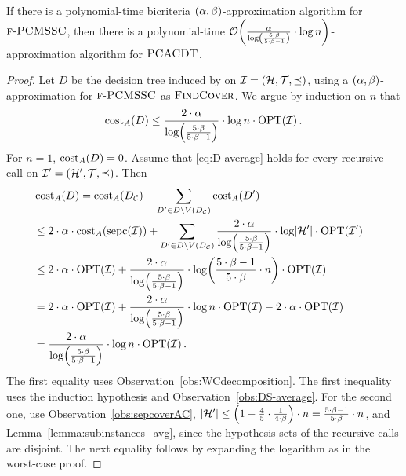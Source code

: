 \begin{theorem}\label{thm:PCMSSC-to-PCACDT}
    \setlength{\emergencystretch}{2em}
    If there is a polynomial-time bicriteria $\br{\alpha, \beta}$-approximation algorithm for $\ProblemPCMSSC$, then there is a polynomial-time $\bigo\br{\frac{\alpha}{\log\br{\frac{5\cdot\beta}{5\cdot\beta -1}}}\cdot \log n}$-approximation algorithm for $\ProblemPCACDT$.
\end{theorem}
\begin{proof}
    \setlength{\emergencystretch}{2em}
    Let $D$ be the decision tree induced by \ProcDecisionTree on $\cI=\br{\cH,\cT,\preceq}$, using a $\br{\alpha,\beta}$-approximation for $\ProblemPCMSSC$ as $\blackBox$.
    We argue by induction on $n$ that
    \begin{equation} \label{eq:D-average}
     \COSTA\br{D} \leq \frac{2\cdot\alpha}{\log\br{\frac{5\cdot\beta}{5\cdot\beta -1}}}\cdot \log n \cdot \OPT\br{\cI}.
    \end{equation}
    For $n=1$, $\COSTA\br{D}=0$. Assume that \eqref{eq:D-average} holds for every recursive call on $\cI'=\br{\cH',\cT,\preceq}$. Then
\begin{align*}
    &\COSTA\br{D}=\COSTA\br{D_{\cC}}+\sum_{D'\in D\setminus V\br{D_{\cC}}}\COSTA\br{D'} &&\\
    &\leq 2\cdot\alpha\cdot\COSTA\br{\sepcover{\cI}}+\sum_{D'\in D\setminus V\br{D_{\cC}}}\frac{2\cdot\alpha}{\log\br{\frac{5\cdot\beta}{5\cdot\beta-1}}}\cdot\log\spr{\cH'}\cdot\OPT\br{\cI'} &&\\
    &\leq 2\cdot\alpha\cdot\OPT\br{\cI}+\frac{2\cdot\alpha}{\log\br{\frac{5\cdot\beta}{5\cdot\beta-1}}}\cdot\log\br{\frac{5\cdot\beta-1}{5\cdot\beta}\cdot n}\cdot\OPT\br{\cI} &&\\
    &=2\cdot\alpha\cdot\OPT\br{\cI}+\frac{2\cdot\alpha}{\log\br{\frac{5\cdot\beta}{5\cdot\beta-1}}}\cdot\log n\cdot\OPT\br{\cI}-2\cdot\alpha\cdot\OPT\br{\cI} &&\\
    &=\frac{2\cdot\alpha}{\log\br{\frac{5\cdot\beta}{5\cdot\beta-1}}}\cdot\log n\cdot\OPT\br{\cI}. &&
\end{align*}
The first equality uses Observation~\ref{obs:WCdecomposition}. The first inequality uses the induction hypothesis and Observation~\ref{obs:DS-average}. For the second one, use Observation~\ref{obs:sepcoverAC}, $\spr{\cH'}\leq\br{1-\frac45\cdot\frac{1}{4\cdot\beta}}\cdot n=\frac{5\cdot\beta-1}{5\cdot\beta}\cdot n$, and Lemma~\ref{lemma:subinstances_avg}, since the hypothesis sets of the recursive calls are disjoint. The next equality follows by expanding the logarithm as in the worst-case proof.
\end{proof}
